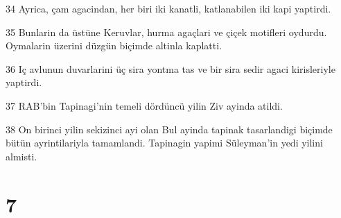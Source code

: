 \par 34 Ayrica, çam agacindan, her biri iki kanatli, katlanabilen iki kapi yaptirdi.
\par 35 Bunlarin da üstüne Keruvlar, hurma agaçlari ve çiçek motifleri oydurdu. Oymalarin üzerini düzgün biçimde altinla kaplatti.
\par 36 Iç avlunun duvarlarini üç sira yontma tas ve bir sira sedir agaci kirisleriyle yaptirdi.
\par 37 RAB'bin Tapinagi'nin temeli dördüncü yilin Ziv ayinda atildi.
\par 38 On birinci yilin sekizinci ayi olan Bul ayinda tapinak tasarlandigi biçimde bütün ayrintilariyla tamamlandi. Tapinagin yapimi Süleyman'in yedi yilini almisti.

\chapter{7}

